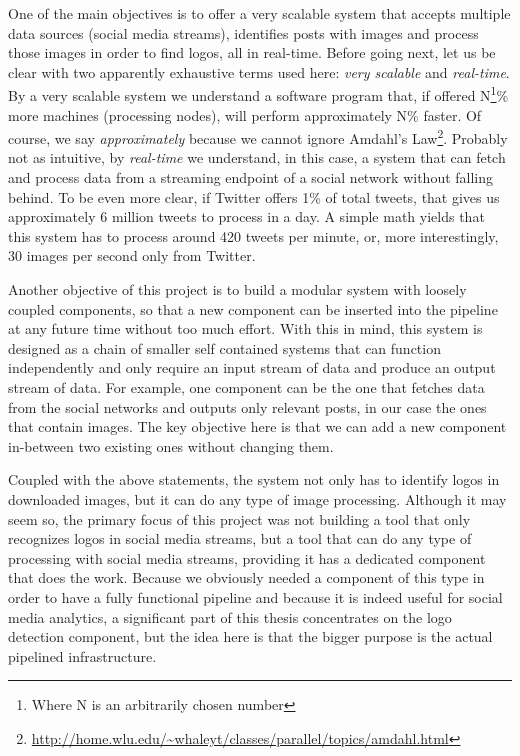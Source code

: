 One of the main objectives is to offer a very scalable system that accepts
multiple data sources (social media streams), identifies posts with images and
process those images in order to find logos, all in real-time. Before going
next, let us be clear with two apparently exhaustive terms used here:
\textit{very scalable} and \textit{real-time}. By a very scalable
system we understand a software program that, if offered
N\footnote{Where N is an arbitrarily chosen number}\% more
machines (processing nodes), will perform approximately N\% faster.
Of course, we say \textit{approximately} because we cannot ignore Amdahl's
Law\footnote{\url{http://home.wlu.edu/~whaleyt/classes/parallel/topics/amdahl.html}}.
Probably not as intuitive, by \textit{real-time} we understand, in this case, a
system that can fetch and process data from a streaming endpoint of a social
network without falling behind. To be even more clear, if Twitter offers
1\% of total tweets, that gives us approximately 6 million tweets to
process in a day. A simple math yields that this system has to process around
420 tweets per minute, or, more interestingly, 30 images per second only from
Twitter.

Another objective of this project is to build a modular system with loosely
coupled components, so that a new component can be inserted into the pipeline
at any future time without too much effort. With this in mind, this system is
designed as a chain of smaller self contained systems that can function
independently and only require an input stream of data and produce
an output stream of data. For example, one component can be the one that
fetches data from the social networks and outputs only relevant posts, in our
case the ones that contain images. The key objective here is that we can add
a new component in-between two existing ones without changing them.

Coupled with the above statements, the system not only has to identify logos
in downloaded images, but it can do any type of image processing. Although it
may seem so, the primary focus of this project was not building a tool that
only recognizes logos in social media streams, but a tool that can do any type
of processing with social media streams, providing it has a dedicated
component that does the work. Because we obviously needed a component of this type
in order to have a fully functional pipeline and because it is indeed useful
for social media analytics, a significant part of this thesis concentrates on the
logo detection component, but the idea here is that the bigger purpose is the
actual pipelined infrastructure.

